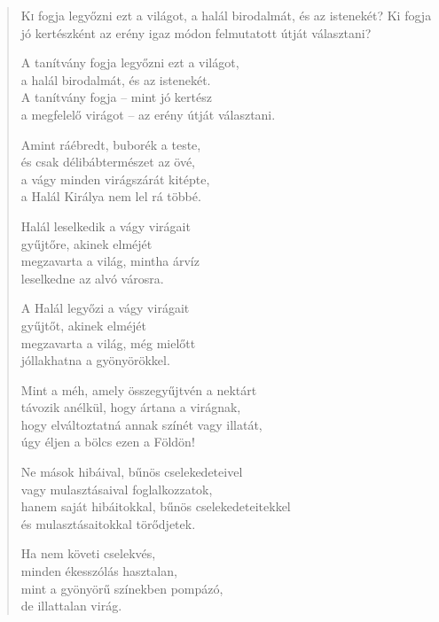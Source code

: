 
\begin{verse}

{\par%
\lettrine{K}{i} {\LettrineTextFont fogja legyőzni ezt a világot,}\newline
a halál birodalmát, és az istenekét?\newline
Ki fogja jó kertészként az erény\verselinebreak
igaz módon felmutatott útját választani?
\par}

 A tanítvány fogja legyőzni ezt a világot,\\
a halál birodalmát, és az istenekét.\\
A tanítvány fogja – mint jó kertész\\
a megfelelő virágot – az erény útját választani.

 Amint ráébredt, buborék a teste,\\
és csak délibábtermészet az övé,\\
a vágy minden virágszárát kitépte,\\
a Halál Királya nem lel rá többé.

 Halál leselkedik a vágy virágait\\
gyűjtőre, akinek elméjét\\
megzavarta a világ, mintha árvíz\\
leselkedne az alvó városra.

 A Halál legyőzi a vágy virágait\\
gyűjtőt, akinek elméjét\\
megzavarta a világ, még mielőtt\\
jóllakhatna a gyönyörökkel.

 Mint a méh, amely összegyűjtvén a nektárt\\
távozik anélkül, hogy ártana a virágnak,\\
hogy elváltoztatná annak színét vagy illatát,\\
úgy éljen a bölcs ezen a Földön!

 Ne mások hibáival, bűnös cselekedeteivel\\
vagy mulasztásaival foglalkozzatok,\\
hanem saját hibáitokkal, bűnös cselekedeteitekkel\\
és mulasztásaitokkal törődjetek.

 Ha nem követi cselekvés,\\
minden ékesszólás hasztalan,\\
mint a gyönyörű színekben pompázó,\\
de illattalan virág.


\end{verse}

